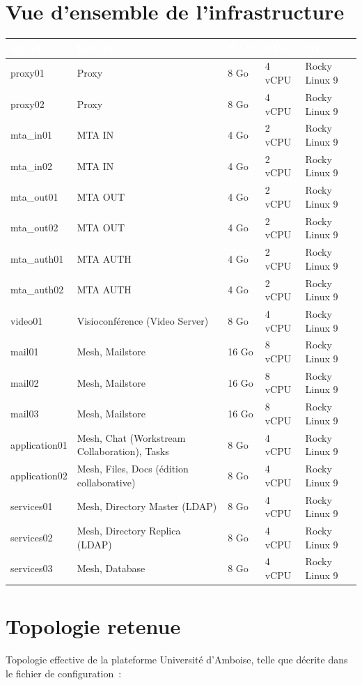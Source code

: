 \documentclass[11pt,a4paper]{report}
\newcommand{\tblhead}[1]{\textcolor{white}{\textbf{#1}}}
\begin{document}
\section{Vue d'ensemble de l'infrastructure}
\begin{longtable}{|p{2.6cm}|p{5cm}|p{1.6cm}|p{1.6cm}|p{2.7cm}|}
\hline
\rowcolor{primary}\tblhead{Nœud} & \tblhead{Rôle(s)} & \tblhead{RAM} & \tblhead{CPU} & \tblhead{OS} \\
\hline
\endhead
proxy01 & Proxy & 8 Go & 4 vCPU & Rocky Linux 9 \\
\hline
proxy02 & Proxy & 8 Go & 4 vCPU & Rocky Linux 9 \\
\hline
mta\_in01 & MTA IN & 4 Go & 2 vCPU & Rocky Linux 9 \\
\hline
mta\_in02 & MTA IN & 4 Go & 2 vCPU & Rocky Linux 9 \\
\hline
mta\_out01 & MTA OUT & 4 Go & 2 vCPU & Rocky Linux 9 \\
\hline
mta\_out02 & MTA OUT & 4 Go & 2 vCPU & Rocky Linux 9 \\
\hline
mta\_auth01 & MTA AUTH & 4 Go & 2 vCPU & Rocky Linux 9 \\
\hline
mta\_auth02 & MTA AUTH & 4 Go & 2 vCPU & Rocky Linux 9 \\
\hline
video01 & Visioconférence (Video Server) & 8 Go & 4 vCPU & Rocky Linux 9 \\
\hline
mail01 & Mesh, Mailstore & 16 Go & 8 vCPU & Rocky Linux 9 \\
\hline
mail02 & Mesh, Mailstore & 16 Go & 8 vCPU & Rocky Linux 9 \\
\hline
mail03 & Mesh, Mailstore & 16 Go & 8 vCPU & Rocky Linux 9 \\
\hline
application01 & Mesh, Chat (Workstream Collaboration), Tasks & 8 Go & 4 vCPU & Rocky Linux 9 \\
\hline
application02 & Mesh, Files, Docs (édition collaborative) & 8 Go & 4 vCPU & Rocky Linux 9 \\
\hline
services01 & Mesh, Directory Master (LDAP) & 8 Go & 4 vCPU & Rocky Linux 9 \\
\hline
services02 & Mesh, Directory Replica (LDAP) & 8 Go & 4 vCPU & Rocky Linux 9 \\
\hline
services03 & Mesh, Database & 8 Go & 4 vCPU & Rocky Linux 9 \\
\hline
\end{longtable}

\clearpage
\section{Topologie retenue}
\label{sec:topologie}
Topologie effective de la plateforme Université d'Amboise, telle que décrite dans le fichier de configuration~:
\end{document}
